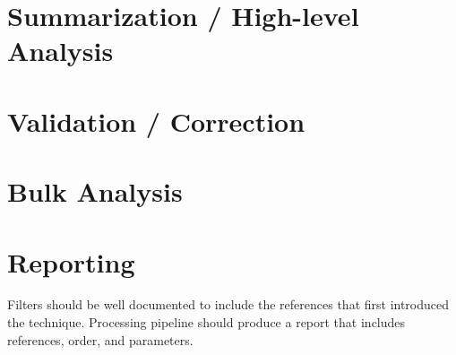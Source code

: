 \documentclass[11pt]{article}
\begin{document}
\begin{multicols}{2}
	\section{Summarization / High-level Analysis}\label{sec:sum_highlevel_analysis}
	
	\section{Validation / Correction}\label{sec:validation_correction}
	
	\section{Bulk Analysis}\label{sec:bulk_analysis}
	
	\section{Reporting}\label{sec:reporting}
		Filters should be well documented to include the references that first introduced the technique.
		Processing pipeline should produce a report that includes references, order, and parameters.


	\end{multicols}

	\newpage
	
\end{document}
